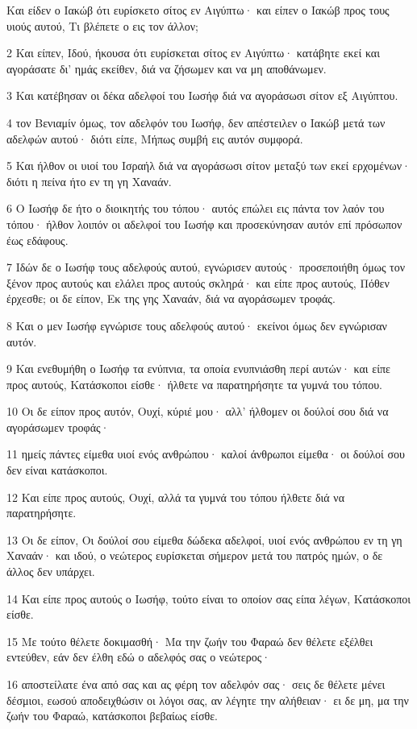 \par Και είδεν ο Ιακώβ ότι ευρίσκετο σίτος εν Αιγύπτω· και είπεν ο Ιακώβ προς τους υιούς αυτού, Τι βλέπετε ο εις τον άλλον;
\par 2 Και είπεν, Ιδού, ήκουσα ότι ευρίσκεται σίτος εν Αιγύπτω· κατάβητε εκεί και αγοράσατε δι' ημάς εκείθεν, διά να ζήσωμεν και να μη αποθάνωμεν.
\par 3 Και κατέβησαν οι δέκα αδελφοί του Ιωσήφ διά να αγοράσωσι σίτον εξ Αιγύπτου.
\par 4 τον Βενιαμίν όμως, τον αδελφόν του Ιωσήφ, δεν απέστειλεν ο Ιακώβ μετά των αδελφών αυτού· διότι είπε, Μήπως συμβή εις αυτόν συμφορά.
\par 5 Και ήλθον οι υιοί του Ισραήλ διά να αγοράσωσι σίτον μεταξύ των εκεί ερχομένων· διότι η πείνα ήτο εν τη γη Χαναάν.
\par 6 Ο Ιωσήφ δε ήτο ο διοικητής του τόπου· αυτός επώλει εις πάντα τον λαόν του τόπου· ήλθον λοιπόν οι αδελφοί του Ιωσήφ και προσεκύνησαν αυτόν επί πρόσωπον έως εδάφους.
\par 7 Ιδών δε ο Ιωσήφ τους αδελφούς αυτού, εγνώρισεν αυτούς· προσεποιήθη όμως τον ξένον προς αυτούς και ελάλει προς αυτούς σκληρά· και είπε προς αυτούς, Πόθεν έρχεσθε; οι δε είπον, Εκ της γης Χαναάν, διά να αγοράσωμεν τροφάς.
\par 8 Και ο μεν Ιωσήφ εγνώρισε τους αδελφούς αυτού· εκείνοι όμως δεν εγνώρισαν αυτόν.
\par 9 Και ενεθυμήθη ο Ιωσήφ τα ενύπνια, τα οποία ενυπνιάσθη περί αυτών· και είπε προς αυτούς, Κατάσκοποι είσθε· ήλθετε να παρατηρήσητε τα γυμνά του τόπου.
\par 10 Οι δε είπον προς αυτόν, Ουχί, κύριέ μου· αλλ' ήλθομεν οι δούλοί σου διά να αγοράσωμεν τροφάς·
\par 11 ημείς πάντες είμεθα υιοί ενός ανθρώπου· καλοί άνθρωποι είμεθα· οι δούλοί σου δεν είναι κατάσκοποι.
\par 12 Και είπε προς αυτούς, Ουχί, αλλά τα γυμνά του τόπου ήλθετε διά να παρατηρήσητε.
\par 13 Οι δε είπον, Οι δούλοί σου είμεθα δώδεκα αδελφοί, υιοί ενός ανθρώπου εν τη γη Χαναάν· και ιδού, ο νεώτερος ευρίσκεται σήμερον μετά του πατρός ημών, ο δε άλλος δεν υπάρχει.
\par 14 Και είπε προς αυτούς ο Ιωσήφ, τούτο είναι το οποίον σας είπα λέγων, Κατάσκοποι είσθε.
\par 15 Με τούτο θέλετε δοκιμασθή· Μα την ζωήν του Φαραώ δεν θέλετε εξέλθει εντεύθεν, εάν δεν έλθη εδώ ο αδελφός σας ο νεώτερος·
\par 16 αποστείλατε ένα από σας και ας φέρη τον αδελφόν σας· σεις δε θέλετε μένει δέσμιοι, εωσού αποδειχθώσιν οι λόγοι σας, αν λέγητε την αλήθειαν· ει δε μη, μα την ζωήν του Φαραώ, κατάσκοποι βεβαίως είσθε.
